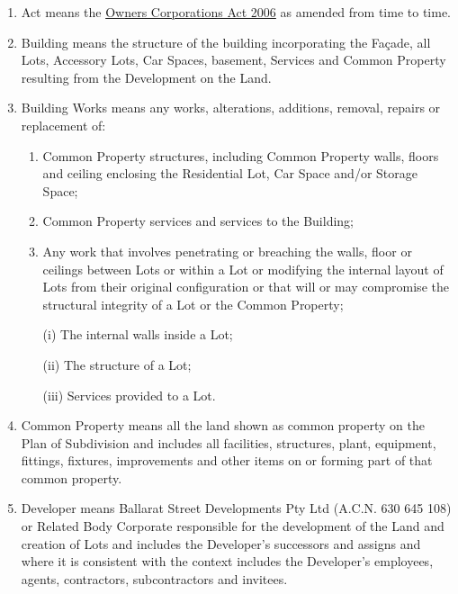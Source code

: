 \documentclass{article}
\begin{document}
\begin{enumerate}[label=\arabic*.]
\begin{enumerate}[label=\arabic{enumi}.\arabic*.]
\begin{enumerate}[label=\arabic{enumi}.\arabic*.]
\begin{enumerate}[label=(\arabic*)]
\item  Act means the \href{https://www.legislation.vic.gov.au/in-force/acts/owners-corporations-act-2006/017}{Owners Corporations Act 2006} as amended from time to time.

\item  Building means the structure of the building incorporating the Façade, all Lots, Accessory Lots, Car Spaces, basement, Services and Common Property resulting from the Development on the Land.

\item  Building Works means any works, alterations, additions, removal, repairs or replacement of:

\begin{enumerate}[label=(\alph*)]

\item  Common Property structures, including Common Property walls, floors and ceiling enclosing the Residential Lot, Car Space and/or Storage Space;

\item  Common Property services and services to the Building;

\item  Any work that involves penetrating or breaching the walls, floor or ceilings between Lots or within a Lot or modifying the internal layout of Lots from their original configuration or that will or may compromise the structural integrity of a Lot or the Common Property;

(i) The internal walls inside a Lot;
\newpage



(ii) The structure of a Lot;

(iii) Services provided to a Lot.

\end{enumerate}

\item  Common Property means all the land shown as common property on the Plan of Subdivision and includes all facilities, structures, plant, equipment, fittings, fixtures, improvements and other items on or forming part of that common property.

\item  Developer means Ballarat Street Developments Pty Ltd (A.C.N. 630 645 108) or Related Body Corporate responsible for the development of the Land and creation of Lots and includes the Developer’s successors and assigns and where it is consistent with the context includes the Developer’s employees, agents, contractors, subcontractors and invitees.


\end{enumerate}
\end{enumerate}
\end{enumerate}
\end{enumerate}
\end{document}
